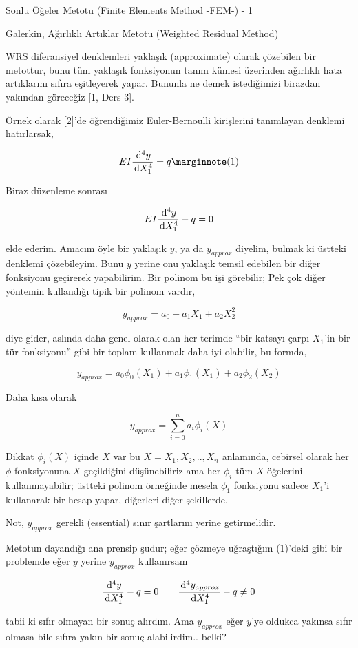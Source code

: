 \documentclass[12pt,fleqn]{article}\usepackage{../../common}
\begin{document}
Sonlu Öğeler Metotu (Finite Elements Method -FEM-) - 1

Galerkin, Ağırlıklı Artıklar Metotu (Weighted Residual Method)

WRS diferansiyel denklemleri yaklaşık (approximate) olarak çözebilen bir
metottur, bunu tüm yaklaşık fonksiyonun tanım kümesi üzerinden ağırlıklı hata
artıklarını sıfıra eşitleyerek yapar. Bununla ne demek istediğimizi birazdan
yakından göreceğiz [1, Ders 3].

Örnek olarak [2]'de öğrendiğimiz Euler-Bernoulli kirişlerini tanımlayan denklemi
hatırlarsak,

$$
E I \frac{\ud^4 y}{\ud X_1^4} = q
\mlabel{1}
$$

Biraz düzenleme sonrası

$$
E I \frac{\,\mathrm{d}^4 y}{\,\mathrm{d} X_1^4} - q = 0
$$

elde ederim. Amacım öyle bir yaklaşık $y$, ya da $y_{approx}$ diyelim, bulmak ki
üstteki denklemi çözebileyim. Bunu $y$ yerine onu yaklaşık temsil edebilen bir
diğer fonksiyonu geçirerek yapabilirim. Bir polinom bu işi görebilir; Pek çok
diğer yöntemin kullandığı tipik bir polinom vardır,

$$
y_{approx} = a_0 + a_1 X_1 + a_2 X_2^2 
$$

diye gider, aslında daha genel olarak olan her terimde ``bir katsayı çarpı
$X_1$'in bir tür fonksiyonu'' gibi bir toplam kullanmak daha iyi olabilir,
bu formda,

$$
y_{approx} = a_0 \phi_0(X_1) + a_1 \phi_1(X_1) + a_2 \phi_2(X_2) 
$$

Daha kısa olarak

$$
y_{approx} = \sum _{i=0}^{n} a_i \phi_i(X) 
$$

Dikkat $\phi_i(X)$ içinde $X$ var bu $X = X_1,X_2,..,X_n$ anlamında, cebirsel
olarak her $\phi$ fonksiyonuna $X$ geçildiğini düşünebiliriz ama her $\phi_i$
tüm $X$ öğelerini kullanmayabilir; üstteki polinom örneğinde mesela $\phi_1$
fonksiyonu sadece $X_1$'i kullanarak bir hesap yapar, diğerleri diğer şekillerde.

Not, $y_{approx}$ gerekli (essential) sınır şartlarını yerine getirmelidir.

Metotun dayandığı ana prensip şudur; eğer çözmeye uğraştığım (1)'deki gibi bir
problemde eğer $y$ yerine $y_{approx}$ kullanırsam

$$
\frac{\,\mathrm{d}^4 y}{\,\mathrm{d} X_1^4} - q = 0 \qquad
\frac{\,\mathrm{d}^4 y_{approx}}{\,\mathrm{d} X_1^4} - q \ne 0
$$

tabii ki sıfır olmayan bir sonuç alırdım. Ama $y_{approx}$ eğer $y$'ye oldukca
yakınsa sıfır olmasa bile sıfıra yakın bir sonuç alabilirdim.. belki?
\end{document}
